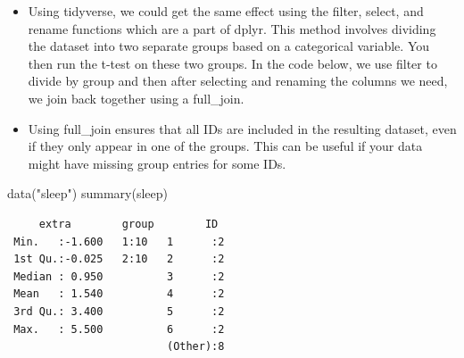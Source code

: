 \documentclass[
  letterpaper,
  DIV=11,
  numbers=noendperiod]{scrreprt}
\newenvironment{Shaded}{\begin{snugshade}}{\end{snugshade}}
\newcommand{\AttributeTok}[1]{\textcolor[rgb]{0.40,0.45,0.13}{#1}}
\newcommand{\ConstantTok}[1]{\textcolor[rgb]{0.56,0.35,0.01}{#1}}
\newcommand{\DecValTok}[1]{\textcolor[rgb]{0.68,0.00,0.00}{#1}}
\newcommand{\FloatTok}[1]{\textcolor[rgb]{0.68,0.00,0.00}{#1}}
\newcommand{\FunctionTok}[1]{\textcolor[rgb]{0.28,0.35,0.67}{#1}}
\newcommand{\NormalTok}[1]{\textcolor[rgb]{0.00,0.23,0.31}{#1}}
\newcommand{\OtherTok}[1]{\textcolor[rgb]{0.00,0.23,0.31}{#1}}
\newcommand{\SpecialCharTok}[1]{\textcolor[rgb]{0.37,0.37,0.37}{#1}}
\newcommand{\StringTok}[1]{\textcolor[rgb]{0.13,0.47,0.30}{#1}}
\providecommand{\tightlist}{%
  \setlength{\itemsep}{0pt}\setlength{\parskip}{0pt}}\usepackage{longtable,booktabs,array}
\begin{document}
\begin{itemize}
\tightlist
\item
  Using tidyverse, we could get the same effect using the filter,
  select, and rename functions which are a part of dplyr. This method
  involves dividing the dataset into two separate groups based on a
  categorical variable. You then run the t-test on these two groups. In
  the code below, we use filter to divide by group and then after
  selecting and renaming the columns we need, we join back together
  using a full\_join.
\item
  Using full\_join ensures that all IDs are included in the resulting
  dataset, even if they only appear in one of the groups. This can be
  useful if your data might have missing group entries for some IDs.
\end{itemize}

\begin{Shaded}
\begin{Highlighting}[]
\FunctionTok{data}\NormalTok{(}\StringTok{"sleep"}\NormalTok{)}
\FunctionTok{summary}\NormalTok{(sleep)}
\end{Highlighting}
\end{Shaded}

\begin{verbatim}
     extra        group        ID   
 Min.   :-1.600   1:10   1      :2  
 1st Qu.:-0.025   2:10   2      :2  
 Median : 0.950          3      :2  
 Mean   : 1.540          4      :2  
 3rd Qu.: 3.400          5      :2  
 Max.   : 5.500          6      :2  
                         (Other):8  
\end{verbatim}

\begin{Shaded}
\end{Shaded}
\end{document}
